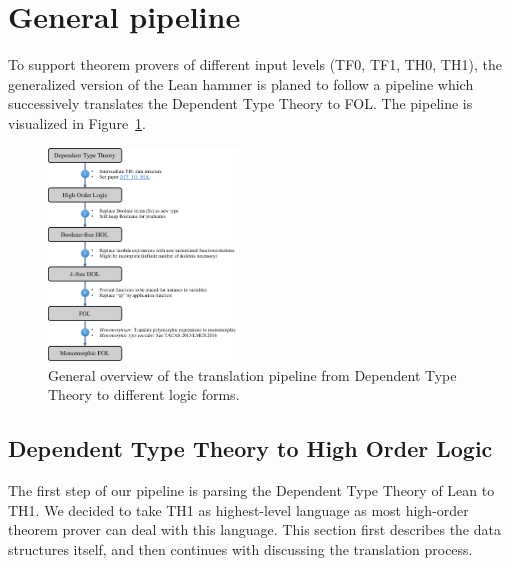 \documentclass[a4paper]{article}
\begin{document}
\section{General pipeline}
\label{sec:general_pipeline}
To support theorem provers of different input levels (TF0, TF1, TH0, TH1), the generalized version of the Lean hammer is planed to follow a pipeline which successively translates the Dependent Type Theory to FOL. The pipeline is visualized in Figure~\ref{fig:pipeline}.
\begin{figure}[ht!]
	\centering
	\includegraphics[width=0.45\textwidth]{figures/pipeline_DTT_HOL.pdf}
	\caption{General overview of the translation pipeline from Dependent Type Theory to different logic forms.}
	\label{fig:pipeline}
\end{figure}
\subsection{Dependent Type Theory to High Order Logic}
The first step of our pipeline is parsing the Dependent Type Theory of Lean to TH1. We decided to take TH1 as highest-level language as most high-order theorem prover can deal with this language. This section first describes the data structures itself, and then continues with discussing the translation process.
\end{document}

